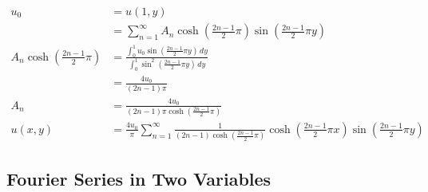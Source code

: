 \documentclass{article}
\begin{document}
\begin{align*}
  u_0                                            & = u(1, y)                                                                                                                                                                                       \\
                                                 & = \sum_{n = 1}^\infty A_n \cosh \left( \frac{2 n - 1}{2} \pi \right) \sin \left( \frac{2 n - 1}{2} \pi y \right)                                                                                \\
  A_n \cosh \left( \frac{2 n - 1}{2} \pi \right) & = \frac{\int_0^1 u_0 \sin \left( \frac{2 n - 1}{2} \pi y \right) \,d y}{\int_0^1 \sin^2 \left( \frac{2 n - 1}{2} \pi y \right) \,d y}                                                           \\
                                                 & = \frac{4 u_0}{(2 n - 1) \pi}                                                                                                                                                                   \\
  A_n                                            & = \frac{4 u_0}{(2 n - 1) \pi \cosh \left( \frac{2 n - 1}{2} \pi \right)}                                                                                                                        \\
  u(x, y)                                        & = \frac{4 u_0}{\pi} \sum_{n = 1}^\infty \frac{1}{(2 n - 1) \cosh \left( \frac{2 n - 1}{2} \pi \right)} \cosh \left( \frac{2 n - 1}{2} \pi x \right) \sin \left( \frac{2 n - 1}{2} \pi y \right)
\end{align*}

\subsection{Fourier Series in Two Variables}

\subsubsection{}
\end{document}
